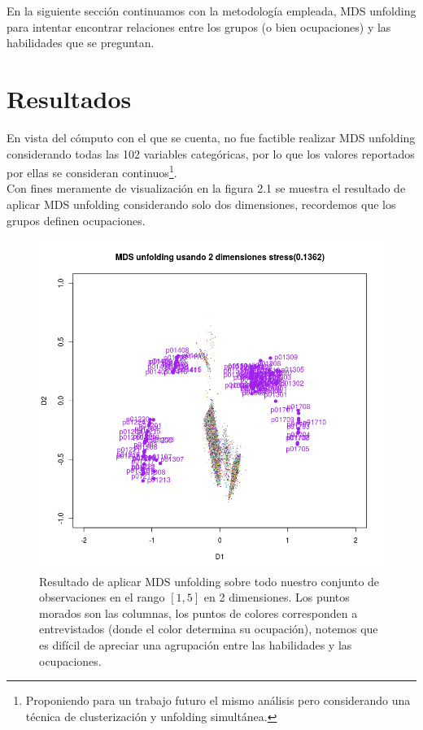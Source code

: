 \documentclass[paper=letter, fontsize=11pt]{scrartcl}
\numberwithin{equation}{section} %
\numberwithin{figure}{section} %
\numberwithin{table}{section} %
\begin{document}
En la siguiente sección continuamos con la metodología empleada, MDS unfolding para intentar encontrar relaciones entre los grupos (o bien ocupaciones) y las habilidades que se preguntan.





\section{Resultados}
En vista del cómputo con el que se cuenta, no fue factible realizar MDS unfolding considerando todas las 102 variables categóricas, por lo que los valores reportados por ellas se consideran continuos\footnote{Proponiendo para un trabajo futuro el mismo análisis pero considerando una técnica de clusterización y unfolding simultánea.}.\\

Con fines meramente de visualización en la figura 2.1 se muestra el resultado de aplicar MDS unfolding considerando solo dos dimensiones, recordemos que los grupos definen ocupaciones.


\begin{figure}[H]
  \begin{center}
    \includegraphics[scale=0.5]{2D.png}
    \caption{Resultado de aplicar MDS unfolding sobre todo nuestro conjunto de observaciones en el rango $[1,5]$ en 2 dimensiones. Los puntos morados son las columnas, los puntos de colores corresponden a entrevistados (donde el color determina su ocupación), notemos que es difícil de apreciar una agrupación entre las habilidades y las ocupaciones.}
    \label{figura4_2}
  \end{center}
\end{figure}
\end{document}
